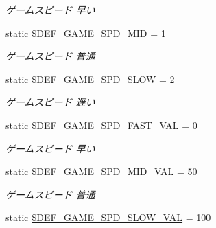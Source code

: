 \begin{DoxyCompactItemize}
\begin{DoxyCompactList}\small\item\em ゲームスピード 早い \end{DoxyCompactList}\item 
static \hyperlink{class_reversi_const_a193b49bd2c83732144f045f9a50aa33e}{\$\+D\+E\+F\+\_\+\+G\+A\+M\+E\+\_\+\+S\+P\+D\+\_\+\+M\+ID} = 1\hypertarget{class_reversi_const_a193b49bd2c83732144f045f9a50aa33e}{}\label{class_reversi_const_a193b49bd2c83732144f045f9a50aa33e}

\begin{DoxyCompactList}\small\item\em ゲームスピード 普通 \end{DoxyCompactList}\item 
static \hyperlink{class_reversi_const_a0b3dc06c436244edd6720ad50a6eb673}{\$\+D\+E\+F\+\_\+\+G\+A\+M\+E\+\_\+\+S\+P\+D\+\_\+\+S\+L\+OW} = 2\hypertarget{class_reversi_const_a0b3dc06c436244edd6720ad50a6eb673}{}\label{class_reversi_const_a0b3dc06c436244edd6720ad50a6eb673}

\begin{DoxyCompactList}\small\item\em ゲームスピード 遅い \end{DoxyCompactList}\item 
static \hyperlink{class_reversi_const_a482c8f8dd0e67619fda3f134ab0a011c}{\$\+D\+E\+F\+\_\+\+G\+A\+M\+E\+\_\+\+S\+P\+D\+\_\+\+F\+A\+S\+T\+\_\+\+V\+AL} = 0\hypertarget{class_reversi_const_a482c8f8dd0e67619fda3f134ab0a011c}{}\label{class_reversi_const_a482c8f8dd0e67619fda3f134ab0a011c}

\begin{DoxyCompactList}\small\item\em ゲームスピード 早い \end{DoxyCompactList}\item 
static \hyperlink{class_reversi_const_ac370025cba197235c70bb8adf896adf8}{\$\+D\+E\+F\+\_\+\+G\+A\+M\+E\+\_\+\+S\+P\+D\+\_\+\+M\+I\+D\+\_\+\+V\+AL} = 50\hypertarget{class_reversi_const_ac370025cba197235c70bb8adf896adf8}{}\label{class_reversi_const_ac370025cba197235c70bb8adf896adf8}

\begin{DoxyCompactList}\small\item\em ゲームスピード 普通 \end{DoxyCompactList}\item 
static \hyperlink{class_reversi_const_ab34ef73bafe6b461bd6c352e393428c4}{\$\+D\+E\+F\+\_\+\+G\+A\+M\+E\+\_\+\+S\+P\+D\+\_\+\+S\+L\+O\+W\+\_\+\+V\+AL} = 100\hypertarget{class_reversi_const_ab34ef73bafe6b461bd6c352e393428c4}{}\label{class_reversi_const_ab34ef73bafe6b461bd6c352e393428c4}


\end{DoxyCompactItemize}
